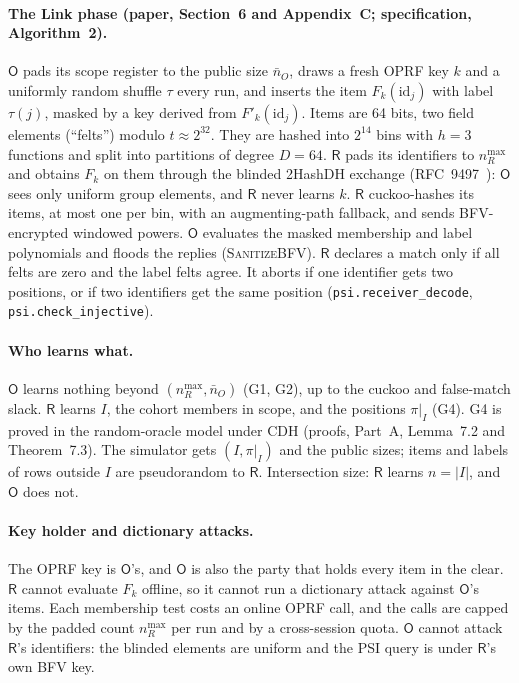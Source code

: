 \documentclass[10pt]{article}
\newcommand{\Rp}{\mathsf{R}}
\newcommand{\Op}{\mathsf{O}}
\begin{document}
\paragraph{The Link phase (paper, Section~6 and Appendix~C; specification, Algorithm~2).}
$\Op$ pads its scope register to the public size $\bar n_O$, draws a fresh OPRF key $k$ and a uniformly random shuffle $\tau$ every run, and inserts the item $F_k(\mathrm{id}_j)$ with label $\tau(j)$, masked by a key derived from $F'_k(\mathrm{id}_j)$. Items are 64 bits, two field elements (``felts'') modulo $t\approx2^{32}$. They are hashed into $2^{14}$ bins with $h=3$ functions and split into partitions of degree $D=64$. $\Rp$ pads its identifiers to $n_R^{\max}$ and obtains $F_k$ on them through the blinded 2HashDH exchange (RFC~9497~\cite{rfc9497,jarecki2014round}): $\Op$ sees only uniform group elements, and $\Rp$ never learns $k$. $\Rp$ cuckoo-hashes its items, at most one per bin, with an augmenting-path fallback, and sends BFV-encrypted windowed powers. $\Op$ evaluates the masked membership and label polynomials and floods the replies (\textsc{SanitizeBFV}). $\Rp$ declares a match only if all felts are zero and the label felts agree. It aborts if one identifier gets two positions, or if two identifiers get the same position (\texttt{psi.receiver\_decode}, \texttt{psi.check\_injective}).

\paragraph{Who learns what.} $\Op$ learns nothing beyond $(n_R^{\max},\bar n_O)$ (G1, G2), up to the cuckoo and false-match slack. $\Rp$ learns $I$, the cohort members in scope, and the positions $\pi|_I$ (G4). G4 is proved in the random-oracle model under CDH (proofs, Part~A, Lemma~7.2 and Theorem~7.3). The simulator gets $(I,\pi|_I)$ and the public sizes; items and labels of rows outside $I$ are pseudorandom to $\Rp$. Intersection size: $\Rp$ learns $n=|I|$, and $\Op$ does not.

\paragraph{Key holder and dictionary attacks.} The OPRF key is $\Op$'s, and $\Op$ is also the party that holds every item in the clear. $\Rp$ cannot evaluate $F_k$ offline, so it cannot run a dictionary attack against $\Op$'s items. Each membership test costs an online OPRF call, and the calls are capped by the padded count $n_R^{\max}$ per run and by a cross-session quota. $\Op$ cannot attack $\Rp$'s identifiers: the blinded elements are uniform and the PSI query is under $\Rp$'s own BFV key.
\end{document}

